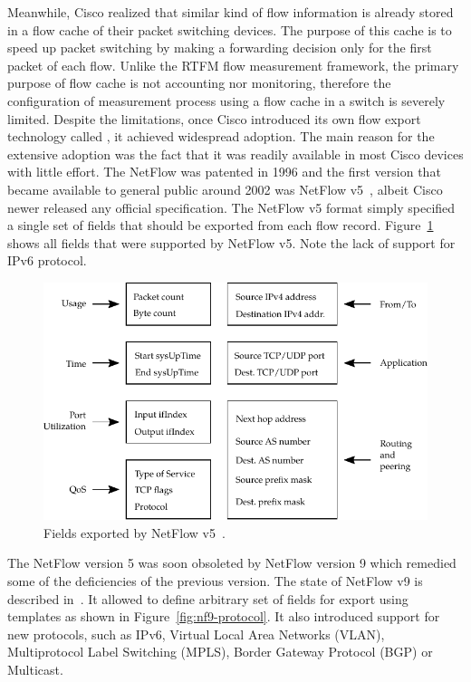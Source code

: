 Meanwhile, Cisco realized that similar kind of flow information is already stored in a flow cache of their packet switching devices. The purpose of this cache is to speed up packet switching by making a forwarding decision only for the first packet of each flow. Unlike the RTFM flow measurement framework, the primary purpose of flow cache is not accounting nor monitoring, therefore the configuration of measurement process using a flow cache in a switch is severely limited. Despite the limitations, once Cisco introduced its own flow export technology called , it achieved widespread adoption. The main reason for the extensive adoption was the fact that it was readily available in most Cisco devices with little effort. The NetFlow was patented in 1996 and the first version that became available to general public around 2002 was NetFlow v5~\cite{CiscoSystems-2007-NetFlow}, albeit Cisco newer released any official specification. The NetFlow v5 format simply specified a single set of fields that should be exported from each flow record. Figure~\ref{fig:nf5-fields} shows all fields that were supported by NetFlow v5. Note the lack of support for IPv6 protocol.

\begin{figure}[t!]
  \begin{center}
    \includegraphics{figures/nf5-fields}
  \end{center}
  \caption{Fields exported by NetFlow v5~\cite{CiscoSystems-2007-NetFlow}.}
  \label{fig:nf5-fields}
\end{figure}

The NetFlow version 5 was soon obsoleted by NetFlow version 9 which remedied some of the deficiencies of the previous version. The state of NetFlow v9 is described in~\cite{rfc3954}. It allowed to define arbitrary set of fields for export using templates as shown in Figure~\ref{fig:nf9-protocol}. It also introduced support for new protocols, such as IPv6, Virtual Local Area Networks (VLAN), Multiprotocol Label Switching (MPLS), Border Gateway Protocol (BGP) or Multicast. 

